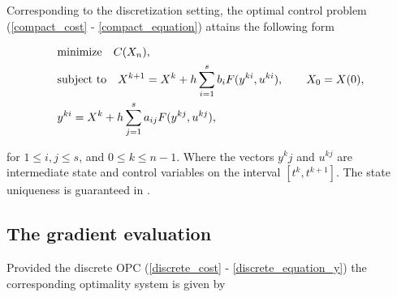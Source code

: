 \documentclass[a4paper,10pt, english]{article}
\newcommand{\D}{\displaystyle}
\begin{document}
 Corresponding to the discretization setting, the optimal control problem (\ref{compact_cost} -  \ref{compact_equation})  attains the following form
 
 \begin{align}
  \D
  & \mbox{minimize}\quad C(X_n), \label{discrete_cost}\\
  & \mbox{subject to} \quad X^{k+1}  = X^k + h\sum_{i=1}^{s}b_iF(y^{ki}, u^{ki}), \qquad X_0 = X(0), \label{discrete_equation_x}\\
  & y^{ki} = X^k + h\sum_{j=1}^{s}a_{ij}F(y^{kj}, u^{kj}),\label{discrete_equation_y}
  \end{align}
 
 for $1\leq i, j\leq s$, and $0\leq k\leq n-1$.
 Where the vectors $y^kj$ and $u^{kj}$ are intermediate state and control variables on the interval $[t^k, t^{k+1}]$. The state uniqueness is guaranteed in \cite{Hager2000}. 
 
 
 






















\newpage
\subsection{The gradient evaluation}
Provided the discrete OPC (\ref{discrete_cost} - \ref{discrete_equation_y}) the corresponding  optimality system  is given by
\end{document}
